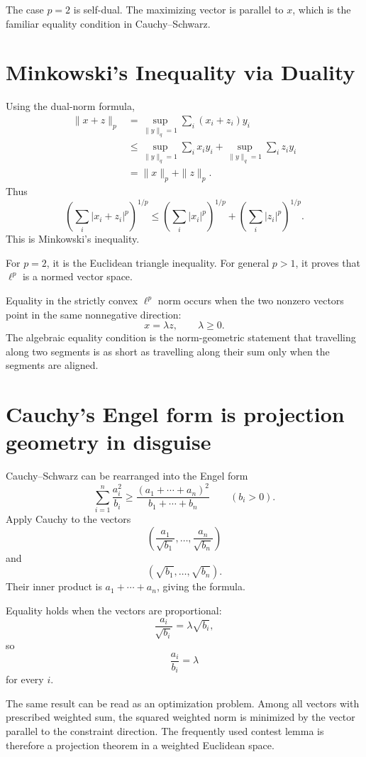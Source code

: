 The case \(p=2\) is self-dual.  The maximizing vector is parallel to \(x\), which is the familiar equality condition in Cauchy--Schwarz.

\section{Minkowski's Inequality via Duality}

Using the dual-norm formula,
\[
\begin{aligned}
  \|x+z\|_p
  &=\sup_{\|y\|_q=1}\sum_i(x_i+z_i)y_i\\
  &\le
  \sup_{\|y\|_q=1}\sum_i x_iy_i
  +
  \sup_{\|y\|_q=1}\sum_i z_iy_i\\
  &=\|x\|_p+\|z\|_p.
\end{aligned}
\]
Thus
\[
  \boxed{
  \left(\sum_i|x_i+z_i|^p\right)^{1/p}
  \le
  \left(\sum_i|x_i|^p\right)^{1/p}
  +
  \left(\sum_i|z_i|^p\right)^{1/p}.}
\]
This is Minkowski's inequality.

For \(p=2\), it is the Euclidean triangle inequality.  For general \(p>1\), it proves that \(\ell^p\) is a normed vector space.

Equality in the strictly convex \(\ell^p\) norm occurs when the two nonzero vectors point in the same nonnegative direction:
\[
  x=\lambda z,
  \qquad
  \lambda\ge0.
\]
The algebraic equality condition is the norm-geometric statement that travelling along two segments is as short as travelling along their sum only when the segments are aligned.

\section{Cauchy's Engel form is projection geometry in disguise}

Cauchy--Schwarz can be rearranged into the Engel form
\[
  \boxed{
  \sum_{i=1}^n\frac{a_i^2}{b_i}
  \ge
  \frac{(a_1+\cdots+a_n)^2}{b_1+\cdots+b_n}}
  \qquad(b_i>0).
\]
Apply Cauchy to the vectors
\[
  \left(\frac{a_1}{\sqrt{b_1}},\ldots,
  \frac{a_n}{\sqrt{b_n}}\right)
\]
and
\[
  (\sqrt{b_1},\ldots,\sqrt{b_n}).
\]
Their inner product is \(a_1+\cdots+a_n\), giving the formula.

Equality holds when the vectors are proportional:
\[
  \frac{a_i}{\sqrt{b_i}}=\lambda\sqrt{b_i},
\]
so
\[
  \frac{a_i}{b_i}=\lambda
\]
for every \(i\).

The same result can be read as an optimization problem.  Among all vectors with prescribed weighted sum, the squared weighted norm is minimized by the vector parallel to the constraint direction.  The frequently used contest lemma is therefore a projection theorem in a weighted Euclidean space.

